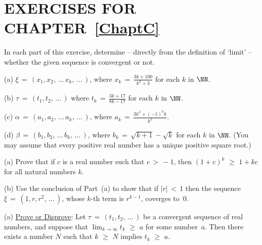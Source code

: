                        \section{EXERCISES FOR CHAPTER~\ref{ChaptC}}
                        \label{SectCEX}

\V
\V
\V
\V

\noindent  \ExCa In each part of this exercise, determine -- directly from the definition of `limit' -- whether the given sequence is convergent or not.


\V

        (a) ${\xi} \,=\,(x_{1},x_{2},\,{\ldots}\,x_{k},\,{\ldots}\,)$, where ${\displaystyle x_{k} \,=\, \frac{3k+100}{k^{2} + 3}}$ for each $k$ in ${\NN}$.

\V

        (b) ${\tau} \,=\, (t_{1},t_{2},\,{\ldots}\,)$ where $t_{k} \,=\, {\displaystyle \frac{3k+17}{8k-17}}$ for each $k$ in ${\NN}$.

\V

        (c) ${\alpha} \,=\, (a_{1},a_{2},\,{\ldots}\,a_{k},\,{\ldots}\,)$, where ${\displaystyle a_{k} \,=\, \frac{3k^{2} + (-1)^{k}k}{k^{2}}}$.

\V

        (d) ${\beta} \,=\, (b_{1},b_{2},\,{\ldots}\,b_{k},\,{\ldots}\,)$, where $b_{k} \,=\, \sqrt{k+1}-\sqrt{k}$ for each $k$ in ${\NN}$.
    (You may assume that every positive real number has a unique positive square root.)

\V
\V                                                                        

 \noindent \ExCb (a) Prove that if $c$ is a real number such that $c \,>\, -1$, then $(1+c)^{k} \,\,{\geq}\,\, 1+kc$ for all natural numbers $k$.

        \V

        (b) Use the conclusion of Part~(a) to show that if $|r|\,<\,1$ then the sequence ${\xi} \,=\, (1, r, r^{2},\,{\ldots}\,)$, whose $k$-th term is $r^{k-1}$, coverges to~$0$.

\V
\V

\noindent \ExCc (a) \underline{Prove or Disprove}: Let ${\tau} \,=\, (t_{1}, t_{2}, \,{\ldots}\,)$ be a convergent sequence of real numbers,
    and suppose that ${\displaystyle \lim_{k {\rightarrow} {\infty}} t_{k} \,\,{\geq}\,\, a}$ for some number~$a$.
    Then there exists a number $N$ such that $k \,\,{\geq}\,\, N$ implies $t_{k} \,\,{\geq}\,\, a$.

\V


